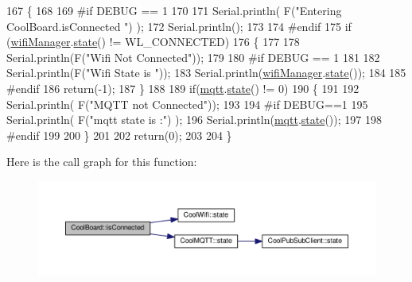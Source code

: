 \begin{DoxyCode}
167 \{
168 
169 \textcolor{preprocessor}{#if DEBUG == 1  }
170 
171     Serial.println( F(\textcolor{stringliteral}{"Entering CoolBoard.isConnected "}) );
172     Serial.println();
173 
174 \textcolor{preprocessor}{#endif}
175     \textcolor{keywordflow}{if} (\hyperlink{class_cool_board_acd88e6003606b47479ebba81e4aceeca}{wifiManager}.\hyperlink{class_cool_wifi_a1c7b4d82a4098d346e7593dce92039fa}{state}() != WL\_CONNECTED)
176     \{
177     
178         Serial.println(F(\textcolor{stringliteral}{"Wifi Not Connected"}));
179 
180 \textcolor{preprocessor}{    #if DEBUG == 1}
181 
182         Serial.println(F(\textcolor{stringliteral}{"Wifi State is "}));
183         Serial.println(\hyperlink{class_cool_board_acd88e6003606b47479ebba81e4aceeca}{wifiManager}.\hyperlink{class_cool_wifi_a1c7b4d82a4098d346e7593dce92039fa}{state}());
184         
185 \textcolor{preprocessor}{    #endif}
186         \textcolor{keywordflow}{return}(-1);
187     \}
188     
189     \textcolor{keywordflow}{if}(\hyperlink{class_cool_board_a2399f44d7c23c1149a335cb3b46d90f1}{mqtt}.\hyperlink{class_cool_m_q_t_t_a5d003307eff78efbd585e42b43b72b6d}{state}() != 0)
190     \{
191         
192         Serial.println( F(\textcolor{stringliteral}{"MQTT not Connected"}));
193 
194 \textcolor{preprocessor}{    #if DEBUG==1}
195         Serial.println( F(\textcolor{stringliteral}{"mqtt state is :"}) );
196         Serial.println(\hyperlink{class_cool_board_a2399f44d7c23c1149a335cb3b46d90f1}{mqtt}.\hyperlink{class_cool_m_q_t_t_a5d003307eff78efbd585e42b43b72b6d}{state}());  
197     
198 \textcolor{preprocessor}{    #endif}
199 
200     \}
201     
202     \textcolor{keywordflow}{return}(0);
203 
204 \}
\end{DoxyCode}
Here is the call graph for this function\+:\nopagebreak
\begin{figure}[H]
\begin{center}
\leavevmode
\includegraphics[width=350pt]{d7/df9/class_cool_board_ad7442cf4b62c7b0d5bd62a0f75ffc065_cgraph}
\end{center}
\end{figure}
\mbox{\label{class_cool_board_ae6b5e1274d760462290192acea4adca8}} 

